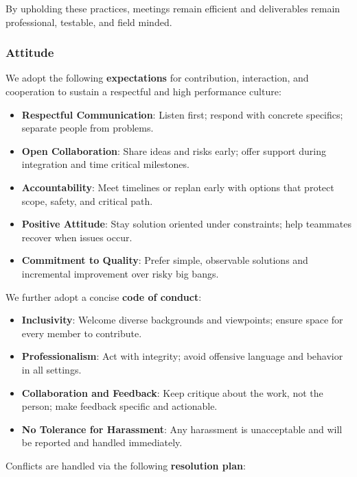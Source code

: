 \documentclass{article}
\begin{document}
\noindent
By upholding these practices, meetings remain efficient and deliverables remain
professional, testable, and field minded.

\subsubsection*{\color{blue}Attitude}

We adopt the following \textbf{expectations} for contribution, interaction, and
cooperation to sustain a respectful and high performance culture:

\begin{itemize}
  \item \textbf{Respectful Communication}: Listen first; respond with concrete
        specifics; separate people from problems.
  \item \textbf{Open Collaboration}: Share ideas and risks early; offer support
        during integration and time critical milestones.
  \item \textbf{Accountability}: Meet timelines or replan early with options
        that protect scope, safety, and critical path.
  \item \textbf{Positive Attitude}: Stay solution oriented under constraints;
        help teammates recover when issues occur.
  \item \textbf{Commitment to Quality}: Prefer simple, observable solutions and
        incremental improvement over risky big bangs.
\end{itemize}

\noindent
We further adopt a concise \textbf{code of conduct}:

\begin{itemize}
  \item \textbf{Inclusivity}: Welcome diverse backgrounds and viewpoints; ensure
        space for every member to contribute.
  \item \textbf{Professionalism}: Act with integrity; avoid offensive language
        and behavior in all settings.
  \item \textbf{Collaboration and Feedback}: Keep critique about the work, not
        the person; make feedback specific and actionable.
  \item \textbf{No Tolerance for Harassment}: Any harassment is unacceptable
        and will be reported and handled immediately.
\end{itemize}

\noindent
Conflicts are handled via the following \textbf{resolution plan}:
\end{document}
